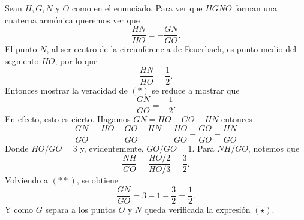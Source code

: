 \begin{sol}
	Sean $H,G,N$ y $O$ como en el enunciado. Para ver que $HGNO$ forman una cuaterna armónica queremos ver que
	\[ \frac{HN}{HO} = -\frac{GN}{GO}.\tag{$\ast$} \]
	El punto $N$, al ser centro de la circunferencia de Feuerbach, es punto medio del segmento $HO$, por lo que
	\[ \frac{HN}{HO} = \frac{1}{2}. \]
	Entonces mostrar la veracidad de $(\ast)$ se reduce a mostrar que
	\[\tag{$\star$} \frac{GN}{GO} = -\frac{1}{2}. \]
	En efecto, esto es cierto. Hagamos $GN=HO-GO-HN$ entonces
	\[\tag{$\ast\ast$} \frac{GN}{GO} = \frac{HO-GO-HN}{GO} = \frac{HO}{GO} - \frac{GO}{GO} - \frac{HN}{GO} \]
	Donde $HO/GO = 3$ y, evidentemente, $GO/GO=1$. Para $NH/GO$, notemos que
	\[ \frac{NH}{GO} = \frac{HO/2}{HO/3} = \frac{3}{2}. \]
	Volviendo a $(\ast\ast)$, se obtiene
	\[ \frac{GN}{GO} = 3-1-\frac{3}{2} = \frac{1}{2}. \]
	Y como $G$ separa a los puntos $O$ y $N$ queda verificada la expresión $(\star)$.
\end{sol}
	
